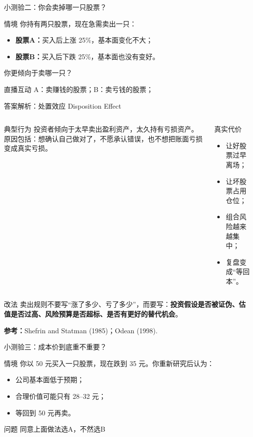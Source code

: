 \documentclass[UTF8,aspectratio=169,11pt]{ctexbeamer}
\newcommand{\source}[1]{\vfill{\scriptsize\color{aqgray}\textbf{参考：}#1}}
\begin{document}
\begin{frame}{小测验二：你会卖掉哪一只股票？}
\begin{casebox}{情境}
\small
你持有两只股票，现在急需卖出一只：
\begin{itemize}
\item \textbf{股票A：}买入后上涨 25\%，基本面变化不大；
\item \textbf{股票B：}买入后下跌 25\%，基本面也没有变好。
\end{itemize}
你更倾向于卖哪一只？
\end{casebox}
\vspace{0.25cm}
\begin{keybox}{直播互动}
\small
A：卖赚钱的股票；\quad B：卖亏钱的股票；\quad 
\end{keybox}
\end{frame}

\begin{frame}{答案解析：处置效应 Disposition Effect}
\begin{columns}[T,totalwidth=\textwidth]
\begin{casebox}{典型行为}
\small
投资者倾向于太早卖出盈利资产，太久持有亏损资产。原因包括：想确认自己做对了，不愿承认错误，也不想把账面亏损变成真实亏损。
\end{casebox}
\begin{riskbox}{真实代价}
\small
\begin{itemize}
\item 让好股票过早离场；
\item 让坏股票占用仓位；
\item 组合风险越来越集中；
\item 复盘变成“等回本”。
\end{itemize}
\end{riskbox}
\end{columns}
\vspace{0.25cm}
\begin{keybox}{改法}
卖出规则不要写“涨了多少、亏了多少”，而要写：\textbf{投资假设是否被证伪、估值是否过高、风险预算是否超标、是否有更好的替代机会}。
\end{keybox}
\source{Shefrin and Statman (1985)；Odean (1998).}
\end{frame}

\begin{frame}{小测验三：成本价到底重不重要？}
\begin{casebox}{情境}
\small
你以 50 元买入一只股票，现在跌到 35 元。你重新研究后认为：
\begin{itemize}
\item 公司基本面低于预期；
\item 合理价值可能只有 28--32 元；
\item 等回到 50 元再卖。
\end{itemize}
\end{casebox}
\vspace{0.2cm}
\begin{keybox}{问题}
\small
同意上面做法选A，不然选B
\end{keybox}
\end{frame}
\end{document}
